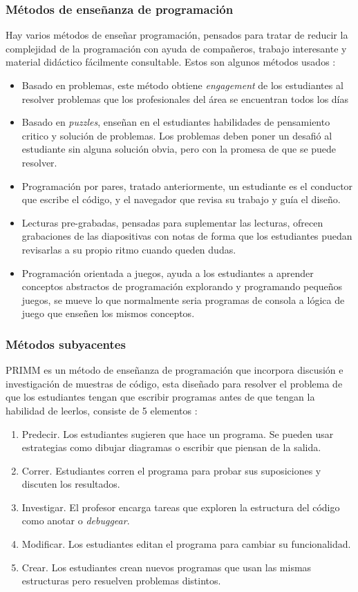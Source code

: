 \subsubsection{Métodos de enseñanza de programación}
Hay varios métodos de enseñar programación, pensados para tratar de reducir la complejidad de la programación con ayuda de compañeros, trabajo interesante y material didáctico fácilmente consultable. Estos son algunos métodos usados \cite{mohorovic}:
\begin{itemize}
    \item Basado en problemas, este método obtiene \textit{engagement} de los estudiantes al resolver problemas que los profesionales del área se encuentran todos los días
    \item Basado en \textit{puzzles}, enseñan en el estudiantes habilidades de pensamiento critico y solución de problemas. Los problemas deben poner un desafió al estudiante sin alguna solución obvia, pero con la promesa de que se puede resolver.
    \item Programación por pares, tratado anteriormente, un estudiante es el conductor que escribe el código, y el navegador que revisa su trabajo y guía el diseño.
    \item Lecturas pre-grabadas, pensadas para suplementar las lecturas, ofrecen grabaciones de las diapositivas con notas de forma que los estudiantes puedan revisarlas a su propio ritmo cuando queden dudas.
    \item Programación orientada a juegos, ayuda a los estudiantes a aprender conceptos abstractos de programación explorando y programando pequeños juegos, se mueve lo que normalmente seria programas de consola a lógica de juego que enseñen los mismos conceptos.
\end{itemize}

\subsubsection{Métodos subyacentes}
PRIMM es un método de enseñanza de programación que incorpora discusión e investigación de muestras de código, esta diseñado para resolver el problema de que los estudiantes tengan que escribir programas antes de que tengan la habilidad de leerlos, consiste de 5 elementos \cite{Sentance}:
\begin{enumerate}
    \item Predecir. Los estudiantes sugieren que hace un programa. Se pueden usar estrategias como dibujar diagramas o escribir que piensan de la salida.
    \item Correr. Estudiantes corren el programa para probar sus suposiciones y discuten los resultados.
    \item Investigar. El profesor encarga tareas que exploren la estructura del código como anotar o \textit{debuggear}.
    \item Modificar. Los estudiantes editan el programa para cambiar su funcionalidad.
    \item Crear. Los estudiantes crean nuevos programas que usan las mismas estructuras pero resuelven problemas distintos.
\end{enumerate}

